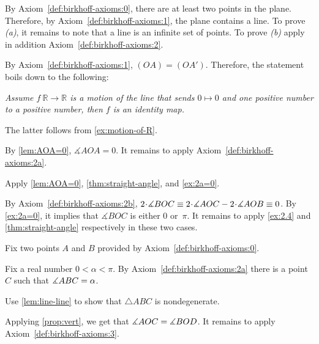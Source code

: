 \begin{multicols}{2}
\setcounter{eqtn}{0}

 By Axiom~\ref{def:birkhoff-axioms:0}, there are at least two points in the plane.
Therefore, by Axiom~\ref{def:birkhoff-axioms:1}, 
the plane contains a line. 
To prove \textit{(a)}, it remains to note that a line is an infinite set of points.
To prove \textit{(b)} apply in addition Axiom~\ref{def:birkhoff-axioms:2}.

\parbf{\ref{ex:[OA)=[OA')}.}
By Axiom~\ref{def:birkhoff-axioms:1},
$(OA)=(OA')$.
Therefore, the statement boils down to the following:

\textit{Assume $f\:\mathbb{R}\to \mathbb{R}$ is a motion of the line that sends $0\mapsto 0$ and one positive number to a positive number, then $f$ is an identity map.}

The latter follows from \ref{ex:motion-of-R}.

By \ref{lem:AOA=0},
$\measuredangle AOA=0$.
It remains to apply Axiom~\ref{def:birkhoff-axioms:2a}.

Apply \ref{lem:AOA=0},
\ref{thm:straight-angle},
and \ref{ex:2a=0}.

By Axiom~\ref{def:birkhoff-axioms:2b},
$2\cdot\measuredangle BOC
\equiv 
2\cdot\measuredangle AOC\z-2\cdot \measuredangle AOB
\equiv 0$.
By \ref{ex:2a=0}, 
it implies that 
$\measuredangle BOC$ is either $0$ or~$\pi$.
It remains to apply \ref{ex:2.4} and \ref{thm:straight-angle} respectively in these two cases.

Fix two points $A$ and $B$ provided by Axiom~\ref{def:birkhoff-axioms:0}.

Fix a real number $0<\alpha<\pi$.
By Axiom~\ref{def:birkhoff-axioms:2a} there is a point $C$ such that $\measuredangle ABC\z=\alpha$.

Use \ref{lem:line-line} to show that $\triangle ABC$ is nondegenerate.

Applying \ref{prop:vert}, we get that
$\measuredangle AOC\z= \measuredangle BOD$.
It remains to apply Axiom~\ref{def:birkhoff-axioms:3}.

\setcounter{eqtn}{0}


\end{multicols}
